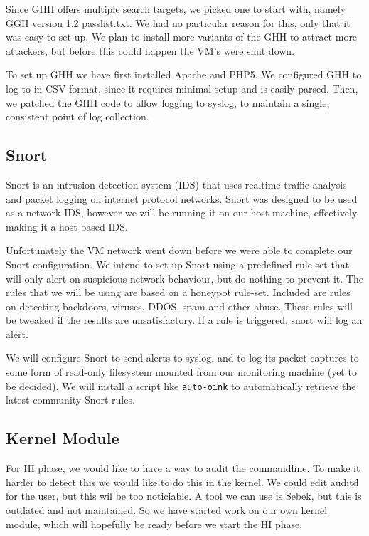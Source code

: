 \documentclass[11pt]{article} %
\begin{document}
Since GHH offers multiple search targets, we picked one to start with, namely GGH version 1.2 passlist.txt.
We had no particular reason for this, only that it was easy to set up. 
We plan to install more variants of the GHH to attract more attackers, but before this could happen the VM's were shut down.

To set up GHH we have first installed Apache and PHP5.
We configured GHH to log to in CSV format, since it requires minimal setup and is easily parsed.
Then, we patched the GHH code to allow logging to syslog, to maintain a single, consistent point of log collection.

\subsection{Snort}
Snort is an intrusion detection system (IDS) that uses realtime traffic analysis and packet logging on internet protocol networks.
Snort was designed to be used as a network IDS, however we will be running it on our host machine, effectively making it a host-based IDS.

Unfortunately the VM network went down before we were able to complete our Snort configuration.
We intend to set up Snort using a predefined rule-set that will only alert on suspicious network behaviour, but do nothing to prevent it. 
The rules that we will be using are based on a honeypot rule-set. %
Included are rules on detecting backdoors, viruses, DDOS, spam and other abuse.
These rules will be tweaked if the results are unsatisfactory.
If a rule is triggered, snort will log an alert.

We will configure Snort to send alerts to syslog, and to log its packet captures to some form of read-only filesystem mounted from our monitoring machine (yet to be decided).
We will install a script like \verb|auto-oink| to automatically retrieve the latest community Snort rules.

\subsection{Kernel Module}

For HI phase, we would like to have a way to audit the commandline. 
To make it harder to detect this we would like to do this in the kernel.
We could edit auditd for the user, but this wil be too noticiable. 
A tool we can use is Sebek, but this is outdated and not maintained.
So we have started work on our own kernel module, which will hopefully be ready before we start the HI phase.












\end{document}
